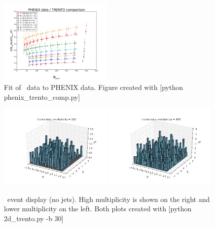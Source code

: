 \documentclass[11pt]{article}
\begin{document}
\begin{figure}[h]
\begin{center}
\includegraphics[width=0.49\textwidth]{phenix_trento_comp.pdf}
\caption{Fit of \trento\ data to PHENIX data. Figure created with [python phenix\_trento\_comp.py]}
\label{fig_phenix_trento_comp}
\end{center}
\end{figure}

\begin{figure}[h]
\begin{center}
\includegraphics[width=0.49\textwidth]{2d_trento1.png}
\includegraphics[width=0.49\textwidth]{2d_trento2.png}
\caption{\trento\ event display (no jets). High multiplicity is shown on the right and lower multiplicity on the left. Both plots created with [python 2d\_trento.py -b 30]}
\label{fig_2d_trento}
\end{center}
\end{figure}
\end{document}

